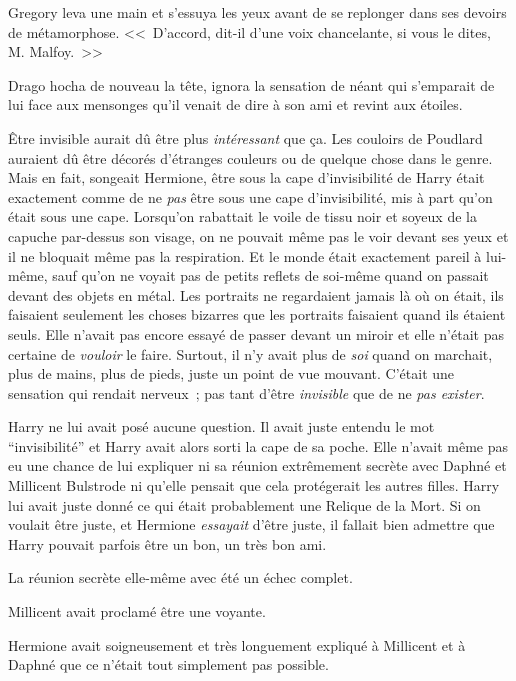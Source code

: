 Gregory leva une main et s'essuya les yeux avant de se replonger dans ses devoirs de métamorphose. <<~D'accord, dit-il d'une voix chancelante, si vous le dites, M. Malfoy.~>>

Drago hocha de nouveau la tête, ignora la sensation de néant qui s'emparait de lui face aux mensonges qu'il venait de dire à son ami et revint aux étoiles.


Être invisible aurait dû être plus \emph{intéressant} que ça. Les couloirs de Poudlard auraient dû être décorés d'étranges couleurs ou de quelque chose dans le genre. Mais en fait, songeait Hermione, être sous la cape d'invisibilité de Harry était exactement comme de ne \emph{pas} être sous une cape d'invisibilité, mis à part qu'on était sous une cape. Lorsqu'on rabattait le voile de tissu noir et soyeux de la capuche par-dessus son visage, on ne pouvait même pas le voir devant ses yeux et il ne bloquait même pas la respiration. Et le monde était exactement pareil à lui-même, sauf qu'on ne voyait pas de petits reflets de soi-même quand on passait devant des objets en métal. Les portraits ne regardaient jamais là où on était, ils faisaient seulement les choses bizarres que les portraits faisaient quand ils étaient seuls. Elle n'avait pas encore essayé de passer devant un miroir et elle n'était pas certaine de \emph{vouloir} le faire. Surtout, il n'y avait plus de \emph{soi} quand on marchait, plus de mains, plus de pieds, juste un point de vue mouvant. C'était une sensation qui rendait nerveux~; pas tant d'être \emph{invisible} que de ne \emph{pas exister}.

Harry ne lui avait posé aucune question. Il avait juste entendu le mot “invisibilité” et Harry avait alors sorti la cape de sa poche. Elle n'avait même pas eu une chance de lui expliquer ni sa réunion extrêmement secrète avec Daphné et Millicent Bulstrode ni qu'elle pensait que cela protégerait les autres filles. Harry lui avait juste donné ce qui était probablement une Relique de la Mort. Si on voulait être juste, et Hermione \emph{essayait} d'être juste, il fallait bien admettre que Harry pouvait parfois être un bon, un très bon ami.

La réunion secrète elle-même avec été un échec complet.

Millicent avait proclamé être une voyante.

Hermione avait soigneusement et très longuement expliqué à Millicent et à Daphné que ce n'était tout simplement pas possible.

